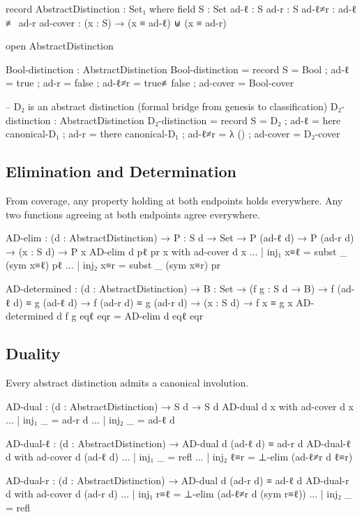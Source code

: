 \documentclass[11pt,a4paper]{article}
\begin{document}
\begin{code}
record AbstractDistinction : Set₁ where
  field
    S      : Set
    ad-ℓ   : S
    ad-r   : S
    ad-ℓ≠r : ad-ℓ ≢ ad-r
    ad-cover : (x : S) → (x ≡ ad-ℓ) ⊎ (x ≡ ad-r)

open AbstractDistinction

Bool-distinction : AbstractDistinction
Bool-distinction = record
  { S = Bool ; ad-ℓ = true ; ad-r = false
  ; ad-ℓ≠r = true≢false ; ad-cover = Bool-cover }

-- D₂ is an abstract distinction (formal bridge from genesis to classification)
D₂-distinction : AbstractDistinction
D₂-distinction = record
  { S      = D₂
  ; ad-ℓ   = here canonical-D₁
  ; ad-r   = there canonical-D₁
  ; ad-ℓ≠r = λ ()
  ; ad-cover = D₂-cover
  }
\end{code}

\subsection{Elimination and Determination}

From coverage, any property holding at both endpoints holds everywhere.
Any two functions agreeing at both endpoints agree everywhere.

\begin{code}
AD-elim : (d : AbstractDistinction) →
          {P : S d → Set} →
          P (ad-ℓ d) → P (ad-r d) →
          (x : S d) → P x
AD-elim d pℓ pr x with ad-cover d x
... | inj₁ x≡ℓ = subst _ (sym x≡ℓ) pℓ
... | inj₂ x≡r = subst _ (sym x≡r) pr

AD-determined : (d : AbstractDistinction) →
                {B : Set} →
                (f g : S d → B) →
                f (ad-ℓ d) ≡ g (ad-ℓ d) →
                f (ad-r d) ≡ g (ad-r d) →
                (x : S d) → f x ≡ g x
AD-determined d f g eqℓ eqr = AD-elim d eqℓ eqr
\end{code}

\subsection{Duality}

Every abstract distinction admits a canonical involution.

\begin{code}
AD-dual : (d : AbstractDistinction) → S d → S d
AD-dual d x with ad-cover d x
... | inj₁ _ = ad-r d
... | inj₂ _ = ad-ℓ d

AD-dual-ℓ : (d : AbstractDistinction) → AD-dual d (ad-ℓ d) ≡ ad-r d
AD-dual-ℓ d with ad-cover d (ad-ℓ d)
... | inj₁ _   = refl
... | inj₂ ℓ≡r = ⊥-elim (ad-ℓ≠r d ℓ≡r)

AD-dual-r : (d : AbstractDistinction) → AD-dual d (ad-r d) ≡ ad-ℓ d
AD-dual-r d with ad-cover d (ad-r d)
... | inj₁ r≡ℓ = ⊥-elim (ad-ℓ≠r d (sym r≡ℓ))
... | inj₂ _   = refl
\end{code}
\end{document}
